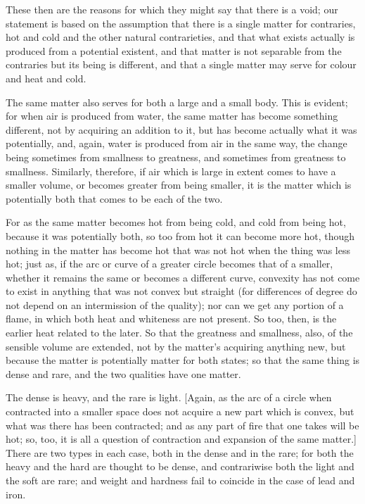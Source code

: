 These then are the reasons for which they might say that there is
a void; our statement is based on the assumption that there is a single
matter for contraries, hot and cold and the other natural contrarieties,
and that what exists actually is produced from a potential existent,
and that matter is not separable from the contraries but its being
is different, and that a single matter may serve for colour and heat
and cold. 

The same matter also serves for both a large and a small body. This
is evident; for when air is produced from water, the same matter has
become something different, not by acquiring an addition to it, but
has become actually what it was potentially, and, again, water is
produced from air in the same way, the change being sometimes from
smallness to greatness, and sometimes from greatness to smallness.
Similarly, therefore, if air which is large in extent comes to have
a smaller volume, or becomes greater from being smaller, it is the
matter which is potentially both that comes to be each of the two.

For as the same matter becomes hot from being cold, and cold from
being hot, because it was potentially both, so too from hot it can
become more hot, though nothing in the matter has become hot that
was not hot when the thing was less hot; just as, if the arc or curve
of a greater circle becomes that of a smaller, whether it remains
the same or becomes a different curve, convexity has not come to exist
in anything that was not convex but straight (for differences of degree
do not depend on an intermission of the quality); nor can we get any
portion of a flame, in which both heat and whiteness are not present.
So too, then, is the earlier heat related to the later. So that the
greatness and smallness, also, of the sensible volume are extended,
not by the matter's acquiring anything new, but because the matter
is potentially matter for both states; so that the same thing is dense
and rare, and the two qualities have one matter. 

The dense is heavy, and the rare is light. [Again, as the arc of a
circle when contracted into a smaller space does not acquire a new
part which is convex, but what was there has been contracted; and
as any part of fire that one takes will be hot; so, too, it is all
a question of contraction and expansion of the same matter.] There
are two types in each case, both in the dense and in the rare; for
both the heavy and the hard are thought to be dense, and contrariwise
both the light and the soft are rare; and weight and hardness fail
to coincide in the case of lead and iron. 

